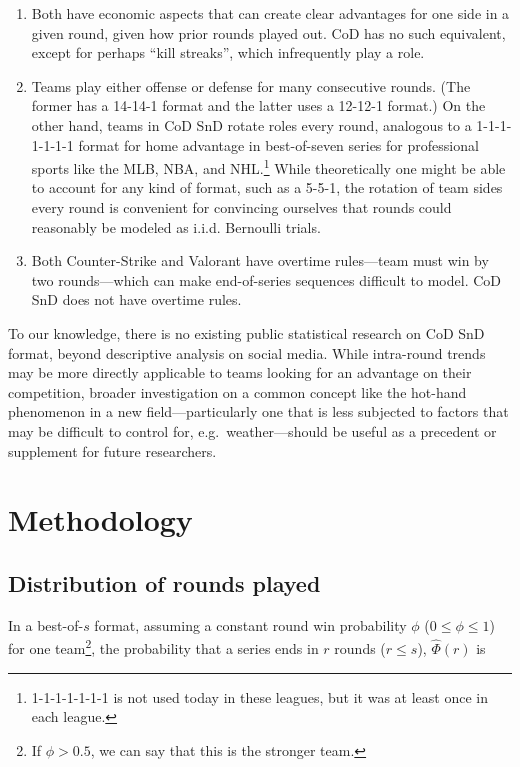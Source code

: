 \documentclass{article}
\providecommand{\tightlist}{%
  \setlength{\itemsep}{0pt}\setlength{\parskip}{0pt}}
\begin{document}
\begin{enumerate}
\def\labelenumi{\arabic{enumi}.}
\tightlist
\item
  Both have economic aspects that can create clear advantages for one
  side in a given round, given how prior rounds played out. CoD has no
  such equivalent, except for perhaps ``kill streaks'', which
  infrequently play a role.
\item
  Teams play either offense or defense for many consecutive rounds. (The
  former has a 14-14-1 format and the latter uses a 12-12-1 format.) On
  the other hand, teams in CoD SnD rotate roles every round, analogous
  to a 1-1-1-1-1-1-1 format for home advantage in best-of-seven series
  for professional sports like the MLB, NBA, and NHL.\footnote{1-1-1-1-1-1-1
    is not used today in these leagues, but it was at least once in each
    league.} While theoretically one might be able to account for any
  kind of format, such as a 5-5-1, the rotation of team sides every
  round is convenient for convincing ourselves that rounds could
  reasonably be modeled as i.i.d. Bernoulli trials.
\item
  Both Counter-Strike and Valorant have overtime rules---team must win
  by two rounds---which can make end-of-series sequences difficult to
  model. CoD SnD does not have overtime rules.
\end{enumerate}

To our knowledge, there is no existing public statistical research on
CoD SnD format, beyond descriptive analysis on social media. While
intra-round trends may be more directly applicable to teams looking for
an advantage on their competition, broader investigation on a common
concept like the hot-hand phenomenon in a new field---particularly one
that is less subjected to factors that may be difficult to control for,
e.g.~weather---should be useful as a precedent or supplement for future
researchers.

\hypertarget{methodology}{%
\section{Methodology}\label{methodology}}

\hypertarget{distribution-of-rounds-played}{%
\subsection{Distribution of rounds
played}\label{distribution-of-rounds-played}}

In a best-of-\(s\) format, assuming a constant round win probability
\(\phi\) (\(0 \leq \phi \leq 1\)) for one team\footnote{If
  \(\phi > 0.5\), we can say that this is the stronger team.}, the
probability that a series ends in \(r\) rounds (\(r \leq s\)),
\(\hat{\Phi}(r)\) is
\end{document}
